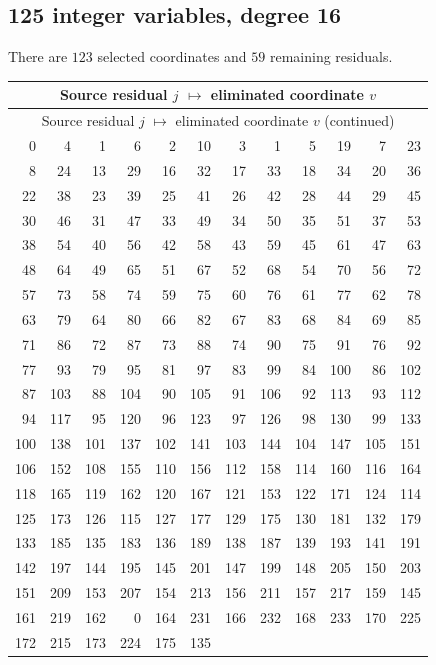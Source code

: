 \subsection{125 integer variables, degree 16}
There are $123$ selected coordinates and $59$ remaining residuals.
\begingroup
\small
\setlength{\tabcolsep}{4pt}
\begin{longtable}{*{6}{r@{\,$\mapsto$\,}r}}
\hline
\multicolumn{12}{c}{Source residual $j$ $\mapsto$ eliminated coordinate $v$}\\
\hline
\endfirsthead
\hline
\multicolumn{12}{c}{Source residual $j$ $\mapsto$ eliminated coordinate $v$ (continued)}\\
\hline
\endhead
0 & 4 & 1 & 6 & 2 & 10 & 3 & 1 & 5 & 19 & 7 & 23 \\
8 & 24 & 13 & 29 & 16 & 32 & 17 & 33 & 18 & 34 & 20 & 36 \\
22 & 38 & 23 & 39 & 25 & 41 & 26 & 42 & 28 & 44 & 29 & 45 \\
30 & 46 & 31 & 47 & 33 & 49 & 34 & 50 & 35 & 51 & 37 & 53 \\
38 & 54 & 40 & 56 & 42 & 58 & 43 & 59 & 45 & 61 & 47 & 63 \\
48 & 64 & 49 & 65 & 51 & 67 & 52 & 68 & 54 & 70 & 56 & 72 \\
57 & 73 & 58 & 74 & 59 & 75 & 60 & 76 & 61 & 77 & 62 & 78 \\
63 & 79 & 64 & 80 & 66 & 82 & 67 & 83 & 68 & 84 & 69 & 85 \\
71 & 86 & 72 & 87 & 73 & 88 & 74 & 90 & 75 & 91 & 76 & 92 \\
77 & 93 & 79 & 95 & 81 & 97 & 83 & 99 & 84 & 100 & 86 & 102 \\
87 & 103 & 88 & 104 & 90 & 105 & 91 & 106 & 92 & 113 & 93 & 112 \\
94 & 117 & 95 & 120 & 96 & 123 & 97 & 126 & 98 & 130 & 99 & 133 \\
100 & 138 & 101 & 137 & 102 & 141 & 103 & 144 & 104 & 147 & 105 & 151 \\
106 & 152 & 108 & 155 & 110 & 156 & 112 & 158 & 114 & 160 & 116 & 164 \\
118 & 165 & 119 & 162 & 120 & 167 & 121 & 153 & 122 & 171 & 124 & 114 \\
125 & 173 & 126 & 115 & 127 & 177 & 129 & 175 & 130 & 181 & 132 & 179 \\
133 & 185 & 135 & 183 & 136 & 189 & 138 & 187 & 139 & 193 & 141 & 191 \\
142 & 197 & 144 & 195 & 145 & 201 & 147 & 199 & 148 & 205 & 150 & 203 \\
151 & 209 & 153 & 207 & 154 & 213 & 156 & 211 & 157 & 217 & 159 & 145 \\
161 & 219 & 162 & 0 & 164 & 231 & 166 & 232 & 168 & 233 & 170 & 225 \\
172 & 215 & 173 & 224 & 175 & 135 & \multicolumn{2}{c}{} & \multicolumn{2}{c}{} & \multicolumn{2}{c}{} \\
\hline
\end{longtable}
\endgroup

